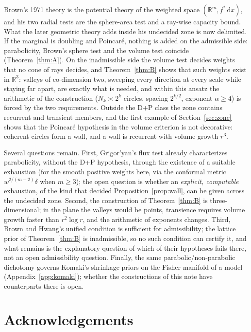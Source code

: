 \documentclass[11pt]{amsart}
\newcommand{\R}{\mathbb{R}}
\newcommand{\dd}{\,\mathrm{d}}
\theoremstyle{plain}
\theoremstyle{definition}
\theoremstyle{remark}
\begin{document}
Brown's 1971 theory is the potential theory of the weighted space
$(\R^m,f^*\dd x)$, and his two radial tests are the sphere-area test and a
ray-wise capacity bound. What the later geometric theory adds inside his
undecided zone is now delimited. If the marginal is doubling and Poincar\'e,
nothing is added on the admissible side: parabolicity, Brown's sphere test and
the volume test coincide (Theorem~\ref{thm:A}). On the inadmissible side the
volume test decides weights that no cone of rays decides, and
Theorem~\ref{thm:B} shows that such weights exist in $\R^3$: valleys of
co-dimension two, sweeping every direction at every scale while staying far
apart, are exactly what is needed, and within this ansatz the arithmetic of the
construction ($N_k\asymp2^k$ circles, spacing $2^{k/2}$, exponent $\alpha\ge4$)
is forced by the two requirements. Outside the D+P class the zone contains recurrent and
transient members, and the first example of Section~\ref{sec:zone} shows that
the Poincar\'e hypothesis in the volume criterion is not decorative: coherent
circles form a wall, and a wall is recurrent with volume growth $r^3$.

Several questions remain. First, Grigor'yan's flux test
\cite[Thm.~7.6]{grigoryan1999} already characterizes parabolicity, without the
D+P hypothesis, through the existence of a suitable exhaustion (for the smooth
positive weights here, via the conformal metric $w^{2/(m-2)}\delta$ when
$m\ge3$); the open question is whether an \emph{explicit, computable} exhaustion,
of the kind that decided Proposition~\ref{prop:wall}, can be given across the
undecided zone.
Second, the construction of Theorem~\ref{thm:B} is three-dimensional; in the
plane the valleys would be points, transience requires volume growth faster
than $r^2\log r$, and the arithmetic of exponents changes. Third, Brown and Hwang's unified condition \cite{brownhwang1982} is sufficient
for admissibility; the lattice prior of Theorem~\ref{thm:B} is inadmissible, so
no such condition can certify it, and what remains is the explanatory question of
which of their hypotheses fails there, not an open admissibility question. Finally, the same parabolic/non-parabolic dichotomy
governs Komaki's shrinkage priors on the Fisher manifold of a model
\cite{komaki2006} (Appendix~\ref{app:komaki}); whether the constructions of
this note have counterparts there is open.

\section*{Acknowledgements}
\end{document}
